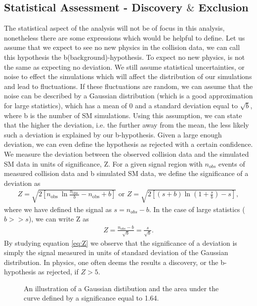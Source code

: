 \subsection{Statistical Assessment - Discovery $\&$ Exclusion}\label{subsec:Sensitivity}
The statistical aspect of the analysis will not be of focus in this analysis, nonetheless there are 
some expressions which would be helpful to define. Let us assume that we expect to see no new physics in the collision
data, we can call this hypothesis the b(background)-hypothesis. To expect no new physics, is not the same as expecting no 
deviation. We still assume statistical uncertainties, or noise to effect the simulations which will affect the distribution of our 
simulations and lead to fluctuations. If these fluctuations are random, we can assume that the noise can be described by a Gaussian distribution 
(which is a good approximation for large statistics), which has a mean of 0 and a standard deviation equal to $\sqrt{b}$, where b is 
the number of \ac{SM} simulations. Using this assumption, we can state that the higher the deviation, i.e. the further away 
from the mean, the less likely such a deviation is explained by our b-hypothesis. Given a large enough deviation, we can even 
define the hypothesis as rejected with a certain confidence.
\\
We measure the deviation between the observed collision data and the simulated \ac{SM} data in units of significance, Z. 
For a given signal region with $n_{obs}$ events of measured collision data and b simulated \ac{SM} data, we define
the significance of a deviation as
\begin{align}\label{eq:Z1}
Z=\sqrt{2\left[n_{\text {obs }} \ln \frac{n_{\text {obs }}}{b}-n_{\mathrm{obs}}+b\right]} \text { or } 
Z=\sqrt{2\left[(s+b) \ln \left(1+\frac{s}{b}\right)-s\right]}, 
\end{align}
where we have defined the signal as $s = n_{obs} - b$. In the case of large statistics ($b>>s$), we can write Z 
as 
\begin{align}\label{eq:Z}
    Z=\frac{n_{o b s}-b}{\sqrt{b}} = \frac{s}{\sqrt{b}}.
\end{align}
By studying equation \ref{eq:Z} we observe that the significance of a deviation is simply the signal measured in units of standard
deviation of the Gaussian distribution. In physics, one often deems the results a discovery, or the b-hypothesis as rejected, if $Z>5$. 
\\
\begin{figure}[H]
    \centering
    \caption{An illustration of a Gaussian distibution and the area under the curve defined by a significance equal to 1.64.}
    \label{fig:ConfInt}
\end{figure}
